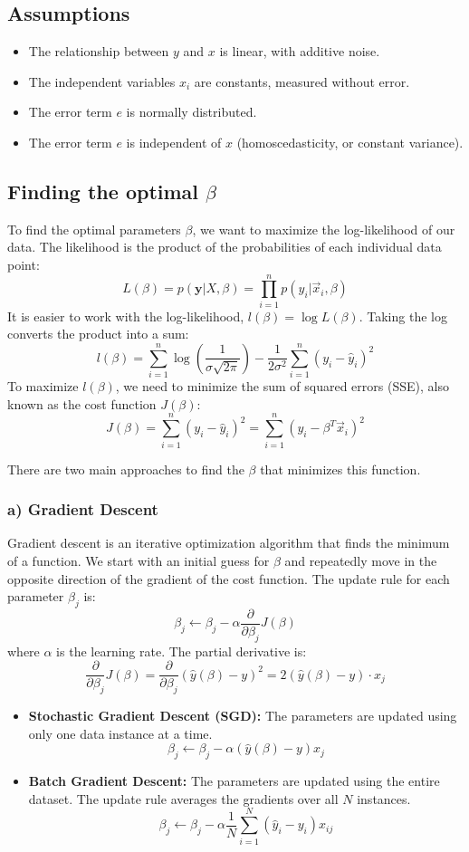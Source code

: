 \documentclass{article}
\begin{document}
\begin{multicols}{2}
	\subsection{Assumptions}
	\begin{itemize}
		\item The relationship between $y$ and $x$ is linear, with additive noise.
		\item The independent variables $x_i$ are constants, measured without error.
		\item The error term $e$ is normally distributed.
		\item The error term $e$ is independent of $x$ (homoscedasticity, or constant variance).
	\end{itemize}

	\subsection{Finding the optimal $\beta$}
	To find the optimal parameters $\beta$, we want to maximize the log-likelihood of our data. The likelihood is the product of the probabilities of each individual data point:
	$$ L(\beta) = p(\mathbf{y}|X, \beta) = \prod_{i=1}^{n} p(y_i | \vec{x}_i, \beta) $$
	It is easier to work with the log-likelihood, $l(\beta) = \log L(\beta)$. Taking the log converts the product into a sum:
	$$ l(\beta) = \sum_{i=1}^{n} \log\left(\frac{1}{\sigma\sqrt{2\pi}}\right) - \frac{1}{2\sigma^2} \sum_{i=1}^{n} (y_i - \hat{y}_i)^2 $$
	To maximize $l(\beta)$, we need to minimize the sum of squared errors (SSE), also known as the cost function $J(\beta)$:
	$$ J(\beta) = \sum_{i=1}^{n} (y_i - \hat{y}_i)^2 = \sum_{i=1}^{n} (y_i - \beta^T \vec{x}_i)^2 $$

	There are two main approaches to find the $\beta$ that minimizes this function.

	\subsubsection{a) Gradient Descent}
	Gradient descent is an iterative optimization algorithm that finds the minimum of a function. We start with an initial guess for $\beta$ and repeatedly move in the opposite direction of the gradient of the cost function. The update rule for each parameter $\beta_j$ is:
	$$ \beta_j \leftarrow \beta_j - \alpha \frac{\partial}{\partial \beta_j} J(\beta) $$
	where $\alpha$ is the learning rate. The partial derivative is:
	$$ \frac{\partial}{\partial \beta_j} J(\beta) = \frac{\partial}{\partial \beta_j} (\hat{y}(\beta) - y)^2 =  2(\hat{y}(\beta) - y) \cdot x_j $$
	\begin{itemize}
		\item \textbf{Stochastic Gradient Descent (SGD):} The parameters are updated using only one data instance at a time.
		      $$ \beta_j \leftarrow \beta_j - \alpha (\hat{y}(\beta) - y) x_j $$
		\item \textbf{Batch Gradient Descent:} The parameters are updated using the entire dataset. The update rule averages the gradients over all $N$ instances.
		      $$ \beta_j \leftarrow \beta_j - \alpha \frac{1}{N} \sum_{i=1}^{N} (\hat{y}_i - y_i) x_{ij} $$
	\end{itemize}


\end{multicols}
\end{document}
